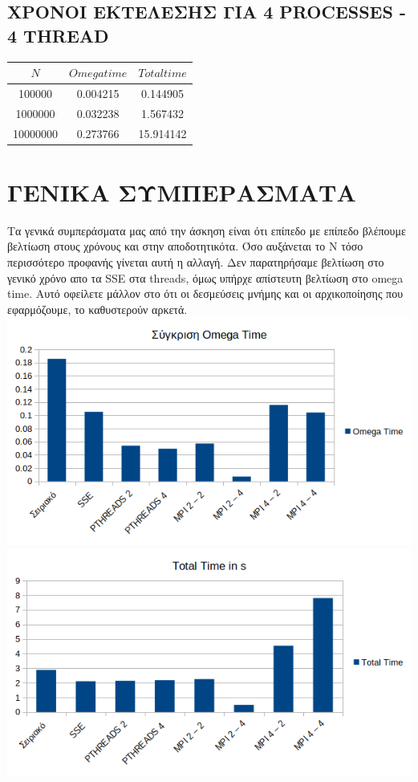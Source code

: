 \documentclass{FR16}
\begin{document}
\subsection{ΧΡΟΝΟΙ ΕΚΤΕΛΕΣΗΣ ΓΙΑ 4 PROCESSES - 4 THREAD}
\begin{center}
\begin{tabular}{c c c}
\arrayrulecolor{Azzurro}
\hline
{\bfseries $Ν$} & {\bfseries $Omega time$} & {\bfseries $Total time$}\\
\hline
100000 & 0.004215 & 0.144905 \\
1000000 & 0.032238 & 1.567432 \\
10000000 & 0.273766 & 15.914142 \\
\hline
\end{tabular}
\end{center}

\newpage

\section{ΓΕΝΙΚΑ ΣΥΜΠΕΡΑΣΜΑΤΑ}
Τα γενικά συμπεράσματα μας από την άσκηση είναι ότι επίπεδο με επίπεδο βλέπουμε βελτίωση στους χρόνους και στην αποδοτητικότα. Όσο αυξάνεται το Ν τόσο περισσότερο προφανής γίνεται αυτή η αλλαγή. Δεν παρατηρήσαμε βελτίωση στο γενικό χρόνο απο τα SSE στα threads, όμως υπήρχε απίστευτη βελτίωση στο omega time. Αυτό οφείλετε μάλλον στο ότι οι δεσμεύσεις μνήμης και οι αρχικοποίησης που εφαρμόζουμε,  το καθυστερούν αρκετά.\newline
\includegraphics[]{images/first_comp.png}\newline
\includegraphics[]{images/sec_comp.png}\newline
\end{document}
